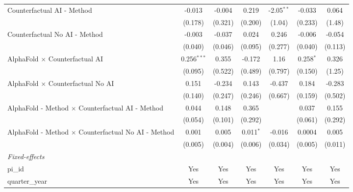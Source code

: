 \begin{tabular}{lcccccc}
   Counterfactual AI - Method                                 & -0.013         & -0.004       & 0.219       & -2.05$^{**}$  & -0.033        & 0.064\\   
                                                              & (0.178)        & (0.321)      & (0.200)     & (1.04)        & (0.233)       & (1.48)\\   
   Counterfactual No AI - Method                              & -0.003         & -0.037       & 0.024       & 0.246         & -0.006        & -0.054\\   
                                                              & (0.040)        & (0.046)      & (0.095)     & (0.277)       & (0.040)       & (0.113)\\   
   AlphaFold $\times$ Counterfactual AI                       & 0.256$^{***}$  & 0.355        & -0.172      & 1.16          & 0.258$^{*}$   & 0.326\\   
                                                              & (0.095)        & (0.522)      & (0.489)     & (0.797)       & (0.150)       & (1.25)\\   
   AlphaFold $\times$ Counterfactual No AI                    & 0.151          & -0.234       & 0.143       & -0.437        & 0.184         & -0.283\\   
                                                              & (0.140)        & (0.247)      & (0.246)     & (0.667)       & (0.159)       & (0.502)\\   
   AlphaFold - Method $\times$ Counterfactual AI - Method     & 0.044          & 0.148        & 0.365       &               & 0.037         & 0.155\\   
                                                              & (0.054)        & (0.101)      & (0.292)     &               & (0.061)       & (0.292)\\   
   AlphaFold - Method $\times$ Counterfactual No AI - Method  & 0.001          & 0.005        & 0.011$^{*}$ & -0.016        & 0.0004        & 0.005\\   
                                                              & (0.005)        & (0.004)      & (0.006)     & (0.034)       & (0.005)       & (0.011)\\   
   \midrule
   \emph{Fixed-effects}\\
   pi\_id                                                     & Yes            & Yes          & Yes         & Yes           & Yes           & Yes\\  
   quarter\_year                                              & Yes            & Yes          & Yes         & Yes           & Yes           & Yes\\  

\end{tabular}
